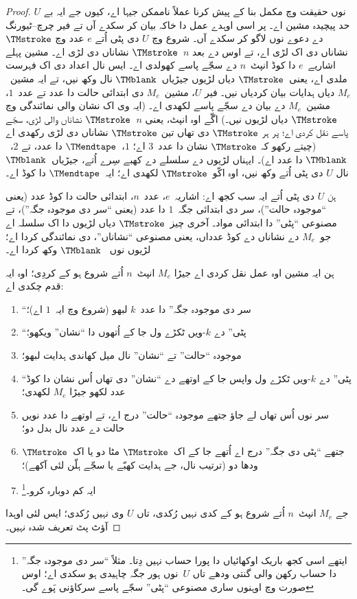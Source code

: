\documentclass[../../../include/open-logic-section]{subfiles}
\begin{document}
\begin{proof}
  $U$ نوں حقیقت وچ مکمل بنا کے پیش کرنا عملاً ناممکن
  جیہا اے، کیوں جے ایہ بے حد پیچیدہ مشین اے۔ پر اسی
  اوہدے عمل دا خاکہ بیان کر سکدے آں تے فیر چرچ--ٹیورنگ
  دے دعوے نوں لاگو کر سکدے آں۔ شروع وچ $U$ دی پٹی
  اُتے $e$ عدد وچ $\TMstroke$ نشاناں دی اک لڑی اے،
  تے اوس دے بعد $n$~$\TMstroke$ نشاناں دی لڑی اے۔
  مشین پہلے اشاریے~$e$ دا کوڈ انپٹ~$n$ دے سجّے
  پاسے کھولدی اے۔ ایس نال اعداد دی اک فہرست ملدی
  اے، یعنی~$\TMstroke$ دیاں لڑیوں جیڑیاں~$\TMblank$
  نال وکھ نیں، تے ایہ مشین~$M_e$ دیاں ہدایات بیان
  کردیاں نیں۔ فیر $U$، مشین~$M_e$ دی ابتدائی حالت
  دا عدد تے عدد~$1$، مشین~$M_e$ دے بیان دے سجّے
  پاسے لکھدی اے۔ (ایہ وی اک نشان والی نمائندگی وچ
  $\TMstroke$ دیاں لڑیوں نیں۔) اگّے اوہ انپٹ،
  یعنی $n$~$\TMstroke$ نشاناں والی لڑی، سجّے
  پاسے نقل کردی اے؛ پر ہر $\TMstroke$ دی تھاں
  تین $\TMstroke$ نشاناں دی لڑی رکھدی اے
  (چیتے رکھو کہ $\TMstroke$ نشان دا عدد~$3$ اے؛
  $1$،~$\TMendtape$ دا عدد، تے $2$،~$\TMblank$
  دا عدد اے)۔ ایہناں لڑیوں دے سلسلے دے کھبے
  سِرے اُتے، جیڑیاں~$\TMblank$ نال $U$ دی پٹی
  اُتے وکھ نیں، اوہ اکّو~$\TMstroke$ لکھدی اے؛
  ایہ~$\TMendtape$ دا کوڈ اے۔

  ہن $U$ دی پٹی اُتے ایہ سب کجھ اے: اشاریہ~$e$،
  عدد~$n$، ابتدائی حالت دا کوڈ عدد (یعنی “موجودہ
  حالت”)، سر دی ابتدائی جگہ~$1$ دا عدد (یعنی
  “سر دی موجودہ جگہ”)، تے مصنوعی “پٹی” دا ابتدائی
  مواد۔ آخری چیز~$\TMstroke$ دیاں لڑیوں دا اک سلسلہ
  اے جو~$M_e$ دے نشاناں دے کوڈ عدداں، یعنی
  مصنوعی “نشاناں”، دی نمائندگی کردا اے؛ لڑیوں نوں
  ~$\TMblank$ وکھ کردا اے۔

  ہن ایہ مشین اوہ عمل نقل کردی اے جیڑا $M_e$
  انپٹ~$n$ اُتے شروع ہو کے کردِی؛ اوہ ایہ قدم چکدی اے:
  \begin{enumerate}
    \item “سر دی موجودہ جگہ” دا عدد~$k$ لبھو
    (شروع وچ ایہ~$1$ اے)؛
    \item “پٹی” دے $k$-ویں ٹکڑے ول جا کے اُتھوں دا
    “نشان” ویکھو؛
    \item{}%
    موجودہ “حالت” تے “نشان” نال میل کھاندی ہدایت لبھو؛
    \item “پٹی” دے $k$-ویں ٹکڑے ول واپس جا کے اوتھے
    دے “نشان” دی تھاں اُس نشان دا کوڈ عدد لکھو
    جیڑا $M_e$ لکھدی؛
    \item سر نوں اُس تھاں لے جاؤ جتھے موجودہ
    “حالت” درج اے، تے اوتھے دا عدد نویں حالت
    دے عدد نال بدل دو؛
    \item جتھے “پٹی دی جگہ” درج اے اُتھے جا کے
    اک~$\TMstroke$ مٹا دو یا اک~$\TMstroke$ ودھا دو
    (ترتیب نال، جے ہدایت کھبّے یا سجّے ہلّن لئی
    آکھے)؛
    \item ایہ کم دوبارہ کرو۔\footnote{ایتھے اسی کجھ باریک
    اوکھائیاں دا پورا حساب نہیں دِتا۔ مثلاً “سر دی
    موجودہ جگہ” دا حساب رکھن والی گنتی ودھے تاں
    $U$~نوں ہور جگہ چاہیدی ہو سکدی اے؛ اوس صورت
    وچ اوہنوں ساری مصنوعی “پٹی” سجّے پاسے
    سرکاؤنی پَوے گی۔}
  \end{enumerate}
  جے $M_e$ انپٹ~$n$ اُتے شروع ہو کے کدی نہیں
  رُکدی، تاں $U$ وی نہیں رُکدی؛ ایس لئی اوہدا
  آؤٹ پٹ تعریف شدہ نہیں۔


\end{proof}
\end{document}

